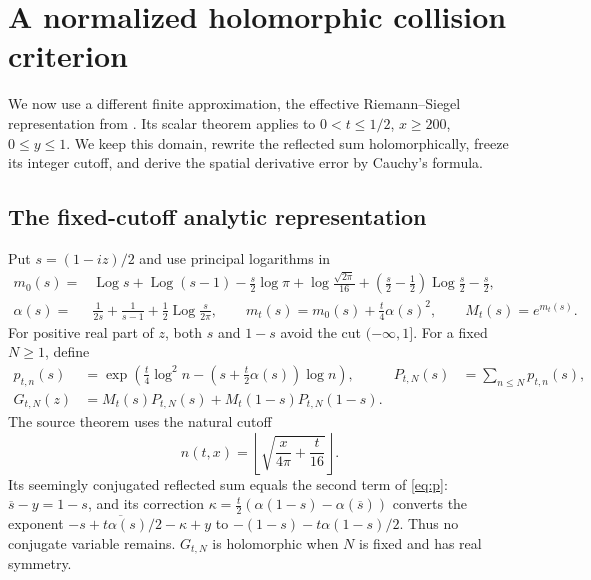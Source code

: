 \documentclass[11pt]{article}
\numberwithin{equation}{section}
\theoremstyle{definition}
\theoremstyle{remark}
\DeclareMathOperator{\Log}{Log}
\begin{document}
\section{A normalized holomorphic collision criterion}
\label{sec:normalization}
We now use a different finite approximation, the effective
Riemann--Siegel representation from \cite[Theorem~1.3]{polymath}.
Its scalar theorem applies to $0<t\le1/2$, $x\ge200$,
$0\le y\le1$. We keep this domain, rewrite the reflected sum
holomorphically, freeze its integer cutoff, and derive the spatial
derivative error by Cauchy's formula.

\subsection{The fixed-cutoff analytic representation}
Put $s=(1-iz)/2$ and use principal logarithms in
\begin{align}\label{eq:m0}
 m_0(s)={}&\Log s+\Log(s-1)-\frac s2\log\pi
 +\log\frac{\sqrt{2\pi}}{16}
 +\left(\frac s2-\frac12\right)\Log\frac s2-\frac s2,\\
 \alpha(s)={}&\frac1{2s}+\frac1{s-1}+\frac12\Log\frac{s}{2\pi},
 \qquad m_t(s)=m_0(s)+\frac t4\alpha(s)^2,
 \qquad M_t(s)=e^{m_t(s)}.\nonumber
\end{align}
For positive real part of $z$, both $s$ and $1-s$ avoid the cut
$(-\infty,1]$. For a fixed $N\ge1$, define
\begin{align}\label{eq:p}
 p_{t,n}(s)&=\exp\left(\frac t4\log^2n
                  -(s+\tfrac t2\alpha(s))\log n\right),&
 P_{t,N}(s)&=\sum_{n\le N}p_{t,n}(s),\\
 G_{t,N}(z)&=M_t(s)P_{t,N}(s)+M_t(1-s)P_{t,N}(1-s).\nonumber
\end{align}
The source theorem uses the natural cutoff
\begin{equation}\label{eq:naturalcutoff}
 n(t,x)=\left\lfloor\sqrt{\frac{x}{4\pi}+\frac t{16}}\right\rfloor.
\end{equation}
Its seemingly conjugated reflected sum equals the second term of
\eqref{eq:p}: $\overline s-y=1-s$, and its correction
$\kappa=\tfrac t2(\alpha(1-s)-\alpha(\overline s))$ converts the
exponent $-\overline{s+t\alpha(s)/2}-\kappa+y$ to
$-(1-s)-t\alpha(1-s)/2$. Thus no conjugate variable remains.
$G_{t,N}$ is holomorphic when $N$ is fixed and has real symmetry.
\end{document}
